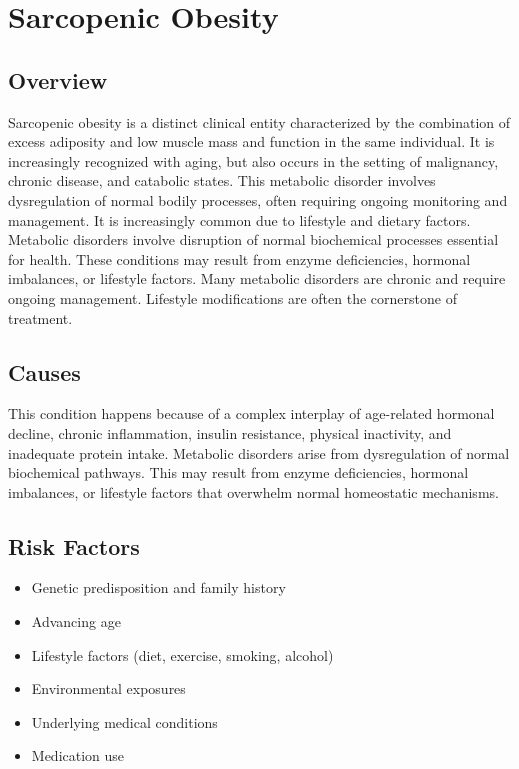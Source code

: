 \chapter{Sarcopenic Obesity}
\label{sec:Sarcopenic Obesity}

\section{Overview}
Sarcopenic obesity is a distinct clinical entity characterized by the combination of excess adiposity and low muscle mass and function in the same individual. It is increasingly recognized with aging, but also occurs in the setting of malignancy, chronic disease, and catabolic states. This metabolic disorder involves dysregulation of normal bodily processes, often requiring ongoing monitoring and management. It is increasingly common due to lifestyle and dietary factors. Metabolic disorders involve disruption of normal biochemical processes essential for health. These conditions may result from enzyme deficiencies, hormonal imbalances, or lifestyle factors. Many metabolic disorders are chronic and require ongoing management. Lifestyle modifications are often the cornerstone of treatment.
\section{Causes}
This condition happens because of a complex interplay of age-related hormonal decline, chronic inflammation, insulin resistance, physical inactivity, and inadequate protein intake. Metabolic disorders arise from dysregulation of normal biochemical pathways. This may result from enzyme deficiencies, hormonal imbalances, or lifestyle factors that overwhelm normal homeostatic mechanisms.   
\section{Risk Factors}
\begin{itemize}[noitemsep]
  \item Genetic predisposition and family history
  \item Advancing age
  \item Lifestyle factors (diet, exercise, smoking, alcohol)
  \item Environmental exposures
  \item Underlying medical conditions
  \item Medication use
\end{itemize}
